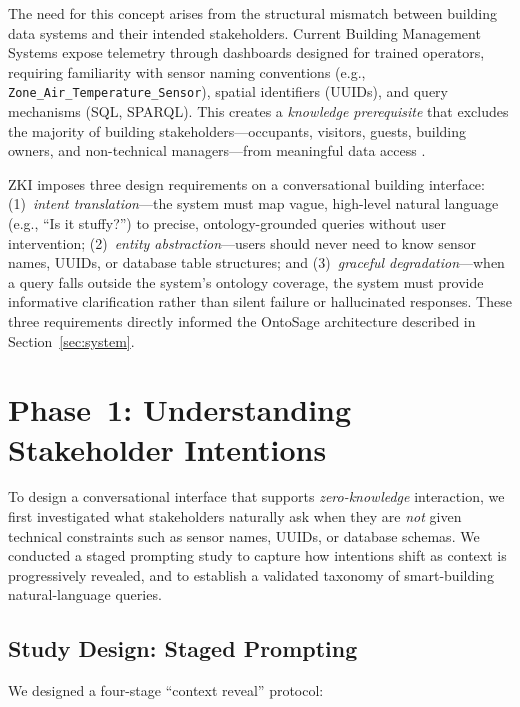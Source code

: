 \documentclass[acmsmall]{acmart}
\begin{document}
The need for this concept arises from the structural mismatch between building data systems and their intended stakeholders. Current Building Management Systems expose telemetry through dashboards designed for trained operators, requiring familiarity with sensor naming conventions (e.g., \texttt{Zone\_Air\_Temperature\_Sensor}), spatial identifiers (UUIDs), and query mechanisms (SQL, SPARQL). This creates a \emph{knowledge prerequisite} that excludes the majority of building stakeholders---occupants, visitors, guests, building owners, and non-technical managers---from meaningful data access \cite{galanos2023,Häikiö2020}.

ZKI imposes three design requirements on a conversational building interface: (1)~\emph{intent translation}---the system must map vague, high-level natural language (e.g., ``Is it stuffy?'') to precise, ontology-grounded queries without user intervention; (2)~\emph{entity abstraction}---users should never need to know sensor names, UUIDs, or database table structures; and (3)~\emph{graceful degradation}---when a query falls outside the system's ontology coverage, the system must provide informative clarification rather than silent failure or hallucinated responses. These three requirements directly informed the OntoSage architecture described in Section~\ref{sec:system}.


\section{Phase~1: Understanding Stakeholder Intentions}
\label{sec:formative-study}

To design a conversational interface that supports \emph{zero-knowledge} interaction, we first investigated what stakeholders naturally ask when they are \emph{not} given technical constraints such as sensor names, UUIDs, or database schemas. We conducted a staged prompting study to capture how intentions shift as context is progressively revealed, and to establish a validated taxonomy of smart-building natural-language queries.

\subsection{Study Design: Staged Prompting}
\label{sec:staged-prompting}

We designed a four-stage ``context reveal'' protocol:
\end{document}
